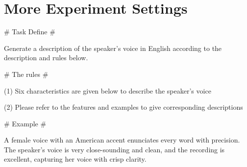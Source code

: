 \documentclass[11pt]{article}
\begin{document}
	\appendix
	


	
	

	\section{More Experiment Settings}
	
	\begin{table}[ht]\centering
		\begin{tcolorbox}[width=1\linewidth, fontupper=\fontsize{10}{12}\selectfont]
			\# Task Define \# 
			
			Generate a description of the speaker's voice in English according to the description and rules below.
			\vspace{\baselineskip} %
			
			\# The rules \# 			
			
			(1) Six characteristics are given below to describe the speaker's voice 
			
			(2) Please refer to the features and examples to give corresponding descriptions 
			\vspace{\baselineskip} %
			
			\# Example \# 
			\vspace{\baselineskip} %
			
			A female voice with an American accent enunciates every word with precision. The speaker's voice is very close-sounding and clean, and the recording is excellent, capturing her voice with crisp clarity.
			
			
			
		\end{tcolorbox}
	    \captionsetup{justification=centering} %
		\caption{Prompts input to GPT-4 for generating speech descriptions.}
		\label{appendix:speech_description_prompt}
	\end{table}
	
\end{document}
